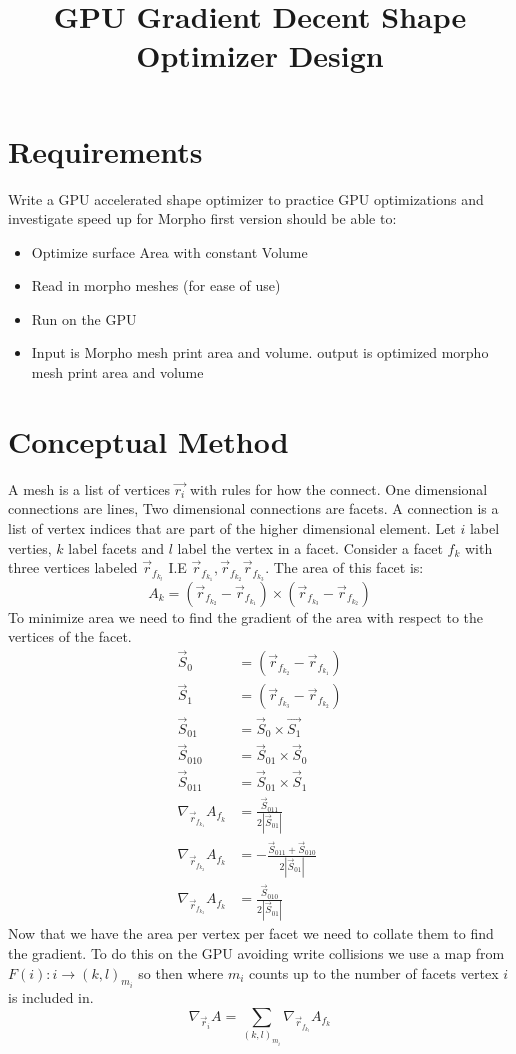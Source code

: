 \documentclass[]{article}
\title{GPU Gradient Decent Shape Optimizer Design}
\author{}
\begin{document}
	
	\maketitle
	
	
	\section{Requirements}
	Write a GPU accelerated shape optimizer to practice GPU optimizations and investigate speed up for Morpho first version should be able to:
	\begin{itemize}
		\item Optimize surface Area with constant Volume
		\item Read in morpho meshes (for ease of use)
		\item Run on the GPU
		\item Input is Morpho mesh print area and volume. output is optimized morpho mesh print area and volume
	\end{itemize}
	
	\section{Conceptual Method}
	A mesh is a list of vertices $\vec{r_i}$ with rules for how the connect. One dimensional connections are lines, Two dimensional connections are facets. A connection is a list of vertex indices that are part of the higher dimensional element. Let $i$ label verties, $k$ label facets and $l$ label the vertex in a facet.
	Consider a facet $f_k$ with three vertices labeled $\vec{r}_{f_{k_l}}$ I.E $\vec{r}_{f_{k_1}},\vec{r}_{f_{k_2}}\vec{r}_{f_{k_3}}$. The area of this facet is:
	$$A_k = (\vec{r}_{f_{k_2}} - \vec{r}_{f_{k_1}}) \times  (\vec{r}_{f_{k_3}} - \vec{r}_{f_{k_2}})$$
	To minimize area we need to find the gradient of the area with respect to the vertices of the facet.
	\begin{align}
	\vec{S}_0 &=  (\vec{r}_{f_{k_2}} - \vec{r}_{f_{k_1}})\\
	\vec{S}_1 &= (\vec{r}_{f_{k_3}} - \vec{r}_{f_{k_2}})\\
	\vec{S}_{01} &= \vec{S}_0\times \vec{S_1}\\
	\vec{S}_{010} &= \vec{S}_{01}\times \vec{S}_0\\
	\vec{S}_{011} &= \vec{S}_{01}\times \vec{S}_1\\
	\nabla_{\vec{r}_{f_{k_1}}}A_{f_k} &=  \frac{\vec{S}_{011}}{2 |\vec{S}_{01}|}\\
	\nabla_{\vec{r}_{f_{k_2}}}A_{f_k} &=  -\frac{\vec{S}_{011}+\vec{S}_{010}}{2 |\vec{S}_{01}|}\\
	\nabla_{\vec{r}_{f_{k_3}}}A_{f_k} &=  \frac{\vec{S}_{010}}{2 |\vec{S}_{01}|}
	\end{align}
	Now that we have the area per vertex per facet we need to collate them to find the gradient. To do this on the GPU avoiding write collisions we use a map from $F(i):i\rightarrow{(k,l)_{m_i}}$ so then where $m_i$ counts up to the number of facets vertex $i$ is included in.
	$$\nabla_{\vec{r}_i} A = \sum_{(k,l)_{m_i}} \nabla_{\vec{r}_{f_{k_l}}}A_{f_k}$$
	
\end{document}
